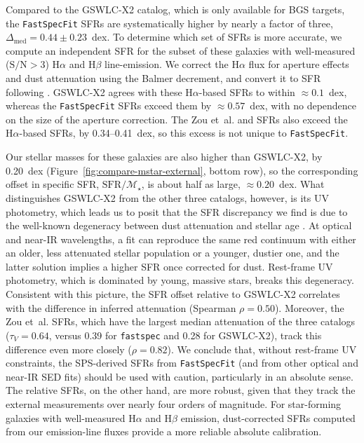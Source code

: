 \documentclass[modern,linenumbers]{aastex702}
\newcommand{\fastspecfit}{\texttt{FastSpecFit}}
\newcommand{\fastspec}{\texttt{fastspec}}
\newcommand{\ha}{\ensuremath{\mathrm{H}\alpha}}
\newcommand{\hb}{\ensuremath{\mathrm{H}\beta}}
\newcommand{\tauv}{\ensuremath{\tau_V}}
\newcommand{\Mstar}{\ensuremath{\mathcal{M}_{\star}}}
\begin{document}
Compared to the GSWLC-X2 catalog, which is only available for
  BGS targets, the \fastspecfit{} SFRs are systematically higher by
  nearly a factor of three, $\Delta_\mathrm{med}=0.44\pm0.23$~dex. To
  determine which set of SFRs is more accurate, we compute an
  independent SFR for the subset of these galaxies with well-measured
  ($\mathrm{S/N}>3$) \ha{} and \hb{} line-emission. We correct the
  \ha{} flux for aperture effects and dust attenuation using the
  Balmer decrement, and convert it to SFR following \citet{hao11a}.
  GSWLC-X2 agrees with these \ha-based SFRs to within
  $\approx0.1$~dex, whereas the \fastspecfit{} SFRs exceed them by
  $\approx0.57$~dex, with no dependence on the size of the aperture
  correction. The Zou et~al. and \citet{siudek24a} SFRs also exceed
  the \ha-based SFRs, by 0.34--0.41~dex, so this excess is not unique
  to \fastspecfit.

Our stellar masses for these galaxies are also higher than
  GSWLC-X2, by 0.20~dex (Figure~\ref{fig:compare-mstar-external},
  bottom row), so the corresponding offset in specific SFR,
  $\mathrm{SFR}/\Mstar$, is about half as large,
  $\approx0.20$~dex. What distinguishes GSWLC-X2 from the other three
  catalogs, however, is its UV photometry, which leads us to posit
  that the SFR discrepancy we find is due to the well-known degeneracy
  between dust attenuation and stellar age
  \citep[e.g.,][]{conroy13a}. At optical and near-IR wavelengths, a
  fit can reproduce the same red continuum with either an older, less
  attenuated stellar population or a younger, dustier one, and the
  latter solution implies a higher SFR once corrected for
  dust. Rest-frame UV photometry, which is dominated by young, massive
  stars, breaks this degeneracy. Consistent with this picture, the SFR
  offset relative to GSWLC-X2 correlates with the difference in
  inferred attenuation (Spearman $\rho=0.50$). Moreover, the Zou
  et~al. SFRs, which have the largest median attenuation of the three
  catalogs ($\tauv=0.64$, versus 0.39 for \fastspec{} and 0.28 for
  GSWLC-X2), track this difference even more closely ($\rho=0.82$). We
  conclude that, without rest-frame UV constraints, the SPS-derived
  SFRs from \fastspecfit{} (and from other optical and near-IR SED
  fits) should be used with caution, particularly in an absolute
  sense. The relative SFRs, on the other hand, are more robust, given
  that they track the external measurements over nearly four orders of
  magnitude. For star-forming galaxies with well-measured \ha{} and
  \hb{} emission, dust-corrected SFRs computed from our emission-line
  fluxes provide a more reliable absolute calibration.
\end{document}
